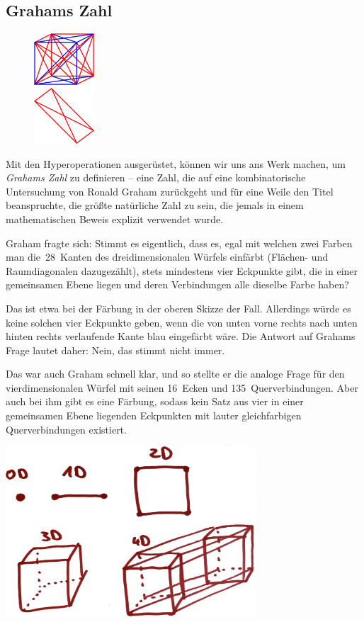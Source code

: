 \documentclass{../../zirkelblatt1718}
\theoremstyle{definition}
\theoremstyle{plain}
\theoremstyle{remark}
\begin{document}
\subsection{Grahams Zahl}

\begin{figure}
\vspace*{-1em}
\includegraphics[width=0.2\textwidth]{graham}
\end{figure}

Mit den Hyperoperationen ausgerüstet, können wir uns ans Werk machen, um
\emph{Grahams Zahl} zu definieren -- eine Zahl, die auf eine kombinatorische
Untersuchung von Ronald Graham zurückgeht und für eine Weile den Titel
beanspruchte, die größte natürliche Zahl zu sein, die jemals in einem
mathematischen Beweis explizit verwendet wurde.

Graham fragte sich: Stimmt es eigentlich, dass es, egal mit welchen zwei Farben
man die~28~Kanten des dreidimensionalen Würfels einfärbt (Flächen- und
Raumdiagonalen dazugezählt), stets mindestens vier Eckpunkte gibt, die in einer
gemeinsamen Ebene liegen und deren Verbindungen alle dieselbe Farbe haben?

Das ist etwa bei der Färbung in der oberen Skizze der Fall. Allerdings würde es
keine solchen vier Eckpunkte geben, wenn die von unten vorne rechts nach unten
hinten rechts verlaufende Kante blau eingefärbt wäre. Die Antwort auf Grahams
Frage lautet daher: Nein, das stimmt nicht immer.

Das war auch Graham schnell klar, und so stellte er die analoge Frage für den
vierdimensionalen Würfel mit seinen 16~Ecken und 135~Querverbindungen. Aber
auch bei ihm gibt es eine Färbung, sodass kein Satz aus vier in einer
gemeinsamen Ebene liegenden Eckpunkten mit lauter gleichfarbigen
Querverbindungen existiert.

\begin{center}
  \includegraphics[width=0.7\textwidth]{4d-tesseract}
\end{center}
\end{document}
